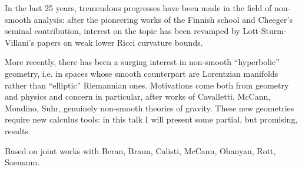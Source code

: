 \mypage
{}
\begin{myabstract}
In the last 25 years, tremendous progresses have been made in the field of non-smooth analysis: after the pioneering works of the Finnish school and Cheeger’s seminal contribution, interest on the topic has been revamped by Lott-Sturm-Villani’s papers on weak lower Ricci curvature bounds.

More recently, there has been a surging interest in non-smooth ``hyperbolic'' geometry, i.e. in spaces whose smooth counterpart are Lorentzian manifolds rather than ``elliptic'' Riemannian ones. Motivations come both from geometry and physics and concern in particular, after works of Cavalletti, McCann, Mondino, Suhr, genuinely non-smooth theories of gravity. These new geometries require new calculus tools: in this talk I will present some partial, but promising, results.

Based on joint works with Beran, Braun, Calisti, McCann, Ohanyan, Rott, Saemann.
\end{myabstract}


